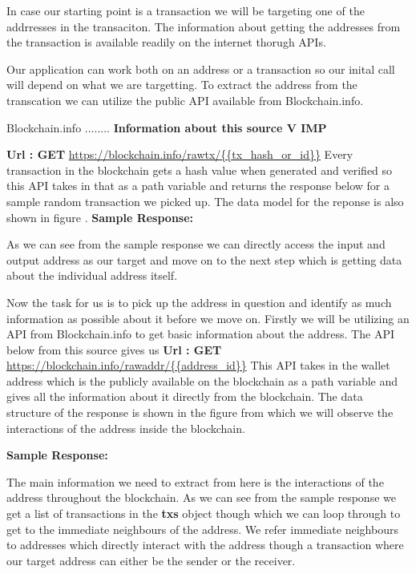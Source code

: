 \documentclass{article}
\begin{document}
        In case our starting point is a transaction we will be targeting one of the addrresses in the transaciton. The information about getting the addresses from the transaction is available readily on the internet thorugh APIs.
        
        Our application can work both on an address or a transaction so our inital call will depend on what we are targetting. 
        To extract the address from the transcation we can utilize the public API available from Blockchain.info\cite{blockchain.com}. 
        
        Blockchain.info ........ \textbf{Information about this source V IMP}
        
        \textbf{Url : GET} \url{https://blockchain.info/rawtx/{{tx_hash_or_id}}}
        Every transaction in the blockchain gets a hash value when generated and verified so this API takes in that as a path variable and returns the response below for a sample random transaction we picked up. The data model for the reponse is also shown in figure \cite{Fig}.
        \textbf{Sample Response: }
        
        As we can see from the sample response we can directly access the input and output address as our target and move on to the next step which is getting data about the individual address itself.
        
        Now the task for us is to pick up the address in question and identify as much information as possible about it before we move on.
        Firstly we will be utilizing an API from Blockchain.info\cite{blockchain.com} to get basic information about the address. The API below from this source gives us
        \textbf{Url : GET} \url{https://blockchain.info/rawaddr/{{address_id}}}
        This API takes in the wallet address which is the publicly available on the blockchain as a path variable and gives all the information about it directly from the blockchain. The data structure of the response is shown in the figure\cite{} from which we will observe the interactions of the address inside the blockchain.
        
        \textbf{Sample Response: }
        
        The main information we need to extract from here is the interactions of the address throughout the blockchain. As we can see from the sample response we get a list of transactions in the \textbf{txs} object though which we can loop through to get to the immediate neighbours of the address. We refer immediate neighbours to addresses which directly interact with the address though a transaction where our target address can either be the sender or the receiver. 
        
\end{document}
